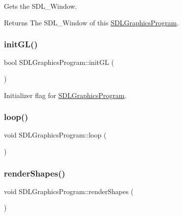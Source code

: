 Gets the S\+D\+L\+\_\+\+Window. 

\begin{DoxyReturn}{Returns}
The S\+D\+L\+\_\+\+Window of this \mbox{\hyperlink{class_s_d_l_graphics_program}{S\+D\+L\+Graphics\+Program}}. 
\end{DoxyReturn}
\mbox{\label{class_s_d_l_graphics_program_a6cc65adc2dde4f2346839685c4e43ea9}} 
\subsubsection{\texorpdfstring{initGL()}{initGL()}}
{\footnotesize\ttfamily bool S\+D\+L\+Graphics\+Program\+::init\+GL (\begin{DoxyParamCaption}{ }\end{DoxyParamCaption})}



Initializer flag for \mbox{\hyperlink{class_s_d_l_graphics_program}{S\+D\+L\+Graphics\+Program}}. 

\mbox{\label{class_s_d_l_graphics_program_afdca0d5835b36a1b18d7eac69056c6ff}} 
\subsubsection{\texorpdfstring{loop()}{loop()}}
{\footnotesize\ttfamily void S\+D\+L\+Graphics\+Program\+::loop (\begin{DoxyParamCaption}{ }\end{DoxyParamCaption})}

\mbox{\label{class_s_d_l_graphics_program_a118c0f825d3d2e8cb3fae0dc4ea1c13e}} 
\subsubsection{\texorpdfstring{renderShapes()}{renderShapes()}}
{\footnotesize\ttfamily void S\+D\+L\+Graphics\+Program\+::render\+Shapes (\begin{DoxyParamCaption}{ }\end{DoxyParamCaption})}



